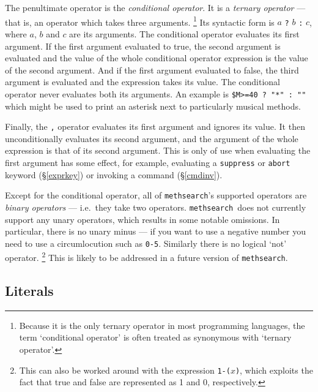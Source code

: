 \documentclass[a4paper,11pt,oneside]{book}
\def\textitidx#1{\textit{#1}\index{#1}}
\def\methsearch{\texttt{meth\-search}}
\newcommand{\sref}[1]{\hyperref[#1]{\S\ref{#1}}}
\begin{document}
The penultimate operator is the \textitidx{conditional operator}.  It is a 
\textit{ternary operator} --- 
that is, an operator which takes three arguments.%
\footnote{Because it is the only ternary operator in most
programming languages, the term `conditional operator' is often treated
as synonymous with `ternary operator'.}  Its syntactic form is 
$a$ \verb+?+ $b$ \verb+:+ $c$, where $a$, $b$ and $c$ are its arguments.
The conditional operator evaluates its first argument.  If the first
argument evaluated to true, the second argument is evaluated and the
value of the whole conditional operator expression is the value of the 
second argument.  And if the first argument evaluated to false, the third
argument is evaluated and the expression takes its value.  The conditional
operator never evaluates both its arguments.  An example is 
\verb+$M>=40 ? "*" : ""+ which might be used to print an asterisk next
to particularly musical methods.

Finally, the \verb+,+ operator
evaluates its first argument and ignores its
value.  It then unconditionally evaluates its second argument, and the 
argument of the whole expression is that of its second argument.  This
is only of use when evaluating the first argument has some effect, for example,
evaluating a \verb+suppress+ or \verb+abort+ keyword (\sref{exprkey}) or
invoking a command (\sref{cmdinv}).

Except for the conditional operator, all of \methsearch's supported operators
are \textit{binary operators} 
--- i.e.\ they take two operators.  
\methsearch\ does not currently support any unary operators,%
 which results in
some notable omissions.   In particular, there is no unary 
minus --- if you want to use a negative 
number you need to use a circumlocution such as \verb+0-5+.  
Similarly there is no logical `not' operator.%
\footnote{This can also be worked around with the expression 
\verb+1-(+$x$\verb+)+, which exploits the fact that true and false are
represented as 1 and 0, respectively.}
This is likely to be addressed in a future version of \methsearch.


\subsection{Literals}\label{lits}
\end{document}
